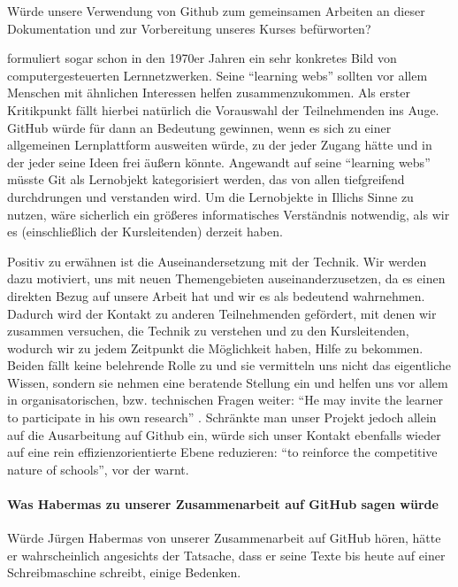 Würde \citeauthor{Illich-1971} unsere Verwendung von Github zum gemeinsamen Arbeiten an dieser Dokumentation und zur Vorbereitung unseres Kurses befürworten?

\citeauthor{Illich-1971} formuliert sogar schon in den 1970er Jahren ein sehr konkretes Bild von computergesteuerten Lernnetzwerken.
Seine ``learning webs'' sollten vor allem Menschen mit ähnlichen Interessen helfen zusammenzukommen.
Als erster Kritikpunkt fällt hierbei natürlich die Vorauswahl der Teilnehmenden ins Auge.
GitHub würde für \citeauthor{Illich-1971} dann an Bedeutung gewinnen, wenn es sich zu einer allgemeinen Lernplattform ausweiten würde, zu der jeder Zugang hätte und in der jeder seine Ideen frei äußern könnte.
Angewandt auf seine ``learning webs'' müsste Git als Lernobjekt kategorisiert werden, das von allen tiefgreifend durchdrungen und verstanden wird.
Um die Lernobjekte in Illichs Sinne zu nutzen, wäre sicherlich ein größeres informatisches Verständnis notwendig, als wir es (einschließlich der Kursleitenden) derzeit haben.

Positiv zu erwähnen ist die Auseinandersetzung mit der Technik.
Wir werden dazu motiviert, uns mit neuen Themengebieten auseinanderzusetzen, da es einen direkten Bezug auf unsere Arbeit hat und wir es als bedeutend wahrnehmen.
Dadurch wird der Kontakt zu anderen Teilnehmenden gefördert, mit denen wir zusammen versuchen, die Technik zu verstehen und zu den Kursleitenden, wodurch wir zu jedem Zeitpunkt die Möglichkeit haben, Hilfe zu bekommen.
Beiden fällt keine belehrende Rolle zu und sie vermitteln uns nicht das eigentliche Wissen, sondern sie nehmen eine beratende Stellung ein und helfen uns vor allem in organisatorischen, bzw. technischen Fragen weiter:
``He may invite the learner to participate in his own research'' \parencite[43]{Illich-1971}.
Schränkte man unser Projekt jedoch allein auf die Ausarbeitung auf Github ein, würde sich unser Kontakt ebenfalls wieder auf eine rein effizienzorientierte Ebene reduzieren: ``to reinforce the competitive nature of schools'', vor der \textcite[35]{Illich-1971} warnt.


\paragraph{Was Habermas zu unserer Zusammenarbeit auf GitHub sagen würde}

Würde Jürgen Habermas von unserer Zusammenarbeit auf GitHub hören, hätte er wahrscheinlich angesichts der Tatsache, dass er seine Texte bis heute auf einer Schreibmaschine schreibt, einige Bedenken.

